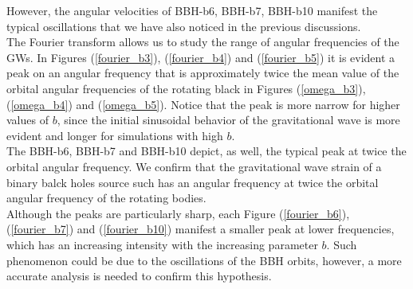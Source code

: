 However, the angular velocities of BBH-b6, BBH-b7, BBH-b10 manifest the typical oscillations that we have also noticed in the previous discussions.\\
The Fourier transform allows us to study the range of angular frequencies of the GWs.
In Figures (\ref{fourier_b3}), (\ref{fourier_b4}) and (\ref{fourier_b5}) it is evident a peak on an angular frequency that is approximately twice the mean value of the orbital angular frequencies of the rotating black in Figures (\ref{omega_b3}), (\ref{omega_b4}) and (\ref{omega_b5}).
Notice that the peak is more narrow for higher values of $b$, since the initial sinusoidal behavior of the gravitational wave is more evident and longer for simulations with high $b$.\\
The BBH-b6, BBH-b7 and BBH-b10 depict, as well, the typical peak at twice the orbital angular frequency.
We confirm that the gravitational wave strain of a binary balck holes source such has an angular frequency at twice the orbital angular frequency of the rotating bodies.\\
Although the peaks are particularly sharp,  each Figure (\ref{fourier_b6}), (\ref{fourier_b7}) and (\ref{fourier_b10}) manifest a smaller peak at lower frequencies, which has an increasing intensity with the increasing parameter $b$.
Such phenomenon could be due to the oscillations of the BBH orbits, however, a more accurate analysis is needed to confirm this hypothesis.\\

\pagebreak

